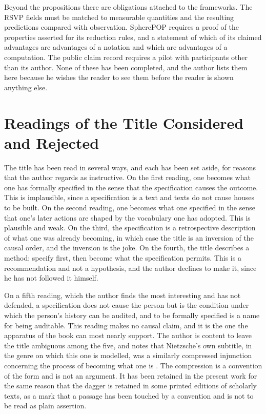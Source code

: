 \documentclass[11pt,openany,twoside]{book}
\theoremstyle{plain}
\theoremstyle{definition}
\theoremstyle{remark}
\begin{document}
Beyond the propositions there are obligations attached to the frameworks. The RSVP fields must be matched to measurable quantities and the resulting predictions compared with observation. SpherePOP requires a proof of the properties asserted for its reduction rules, and a statement of which of its claimed advantages are advantages of a notation and which are advantages of a computation. The public claim record requires a pilot with participants other than its author. None of these has been completed, and the author lists them here because he wishes the reader to see them before the reader is shown anything else.

\chapter{Readings of the Title Considered and Rejected}

The title has been read in several ways, and each has been set aside, for reasons that the author regards as instructive. On the first reading, one becomes what one has formally specified in the sense that the specification causes the outcome. This is implausible, since a specification is a text and texts do not cause houses to be built. On the second reading, one becomes what one specified in the sense that one's later actions are shaped by the vocabulary one has adopted. This is plausible and weak. On the third, the specification is a retrospective description of what one was already becoming, in which case the title is an inversion of the causal order, and the inversion is the joke. On the fourth, the title describes a method: specify first, then become what the specification permits. This is a recommendation and not a hypothesis, and the author declines to make it, since he has not followed it himself.

On a fifth reading, which the author finds the most interesting and has not defended, a specification does not cause the person but is the condition under which the person's history can be audited, and to be formally specified is a name for being auditable. This reading makes no causal claim, and it is the one the apparatus of the book can most nearly support. The author is content to leave the title ambiguous among the five, and notes that Nietzsche's own subtitle, in the genre on which this one is modelled, was a similarly compressed injunction concerning the process of becoming what one is \cite{nietzsche-ecce}. The compression is a convention of the form and is not an argument. It has been retained in the present work for the same reason that the dagger is retained in some printed editions of scholarly texts, as a mark that a passage has been touched by a convention and is not to be read as plain assertion.
\end{document}
